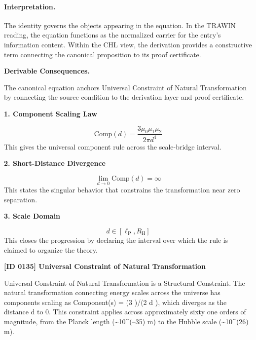 \paragraph{Interpretation.}
The identity governs the objects appearing in the equation. In the TRAWIN reading, the equation functions as the normalized carrier for the entry’s information content. Within the CHL view, the derivation provides a constructive term connecting the canonical proposition to its proof certificate.

\par\vspace{0.35em}
\noindent\textbf{Derivable Consequences.}\quad
\begingroup
\footnotesize
\raggedright
The canonical equation anchors Universal Constraint of Natural Transformation by connecting the source condition to the derivation layer and proof certificate.
\par\endgroup

\noindent\textbf{1. Component Scaling Law}\par
\[
\mathrm{Comp}(d)=\frac{3\mu_0\mu_1\mu_2}{2\pi d^4}
\]
\noindent This gives the universal component rule across the scale-bridge interval.\par
\noindent\textbf{2. Short-Distance Divergence}\par
\[
\lim_{d\to 0}\mathrm{Comp}(d)=\infty
\]
\noindent This states the singular behavior that constrains the transformation near zero separation.\par
\noindent\textbf{3. Scale Domain}\par
\[
d\in [\ell_{\mathrm{P}},R_{\mathrm{H}}]
\]
\noindent This closes the progression by declaring the interval over which the rule is claimed to organize the theory.\par

\clearpage
\noindent\textbf{[ID 0135] Universal Constraint of Natural Transformation}\par
\vspace{0.35em}
\begingroup\small
{}
Universal Constraint of Natural Transformation is a Structural Constraint. The natural transformation connecting energy scales across the universe has components scaling as Component(s) = (3         )/(2   d ), which diverges as the distance d to 0. This constraint applies across approximately sixty one orders of magnitude, from the Planck length (\textasciitilde{}10\textasciicircum{}(--35) m) to the Hubble scale (\textasciitilde{}10\textasciicircum{}(26) m).

